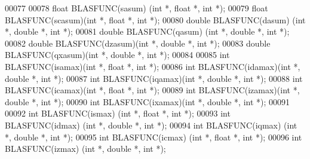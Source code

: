 \begin{DoxyCode}
00077 
00078 \textcolor{keywordtype}{float}  BLASFUNC(sasum) (\textcolor{keywordtype}{int} *, \textcolor{keywordtype}{float}  *, \textcolor{keywordtype}{int} *);
00079 \textcolor{keywordtype}{float}  BLASFUNC(scasum)(\textcolor{keywordtype}{int} *, \textcolor{keywordtype}{float}  *, \textcolor{keywordtype}{int} *);
00080 \textcolor{keywordtype}{double} BLASFUNC(dasum) (\textcolor{keywordtype}{int} *, \textcolor{keywordtype}{double} *, \textcolor{keywordtype}{int} *);
00081 \textcolor{keywordtype}{double} BLASFUNC(qasum) (\textcolor{keywordtype}{int} *, \textcolor{keywordtype}{double} *, \textcolor{keywordtype}{int} *);
00082 \textcolor{keywordtype}{double} BLASFUNC(dzasum)(\textcolor{keywordtype}{int} *, \textcolor{keywordtype}{double} *, \textcolor{keywordtype}{int} *);
00083 \textcolor{keywordtype}{double} BLASFUNC(qxasum)(\textcolor{keywordtype}{int} *, \textcolor{keywordtype}{double} *, \textcolor{keywordtype}{int} *);
00084 
00085 \textcolor{keywordtype}{int}    BLASFUNC(isamax)(\textcolor{keywordtype}{int} *, \textcolor{keywordtype}{float}  *, \textcolor{keywordtype}{int} *);
00086 \textcolor{keywordtype}{int}    BLASFUNC(idamax)(\textcolor{keywordtype}{int} *, \textcolor{keywordtype}{double} *, \textcolor{keywordtype}{int} *);
00087 \textcolor{keywordtype}{int}    BLASFUNC(iqamax)(\textcolor{keywordtype}{int} *, \textcolor{keywordtype}{double} *, \textcolor{keywordtype}{int} *);
00088 \textcolor{keywordtype}{int}    BLASFUNC(icamax)(\textcolor{keywordtype}{int} *, \textcolor{keywordtype}{float}  *, \textcolor{keywordtype}{int} *);
00089 \textcolor{keywordtype}{int}    BLASFUNC(izamax)(\textcolor{keywordtype}{int} *, \textcolor{keywordtype}{double} *, \textcolor{keywordtype}{int} *);
00090 \textcolor{keywordtype}{int}    BLASFUNC(ixamax)(\textcolor{keywordtype}{int} *, \textcolor{keywordtype}{double} *, \textcolor{keywordtype}{int} *);
00091 
00092 \textcolor{keywordtype}{int}    BLASFUNC(ismax) (\textcolor{keywordtype}{int} *, \textcolor{keywordtype}{float}  *, \textcolor{keywordtype}{int} *);
00093 \textcolor{keywordtype}{int}    BLASFUNC(idmax) (\textcolor{keywordtype}{int} *, \textcolor{keywordtype}{double} *, \textcolor{keywordtype}{int} *);
00094 \textcolor{keywordtype}{int}    BLASFUNC(iqmax) (\textcolor{keywordtype}{int} *, \textcolor{keywordtype}{double} *, \textcolor{keywordtype}{int} *);
00095 \textcolor{keywordtype}{int}    BLASFUNC(icmax) (\textcolor{keywordtype}{int} *, \textcolor{keywordtype}{float}  *, \textcolor{keywordtype}{int} *);
00096 \textcolor{keywordtype}{int}    BLASFUNC(izmax) (\textcolor{keywordtype}{int} *, \textcolor{keywordtype}{double} *, \textcolor{keywordtype}{int} *);

\end{DoxyCode}
